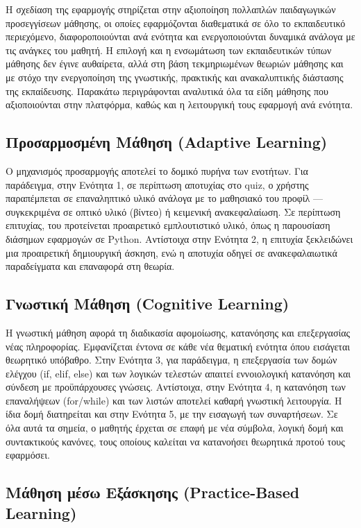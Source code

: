 \documentclass[11pt]{report}
\begin{document}
Η σχεδίαση της εφαρμογής στηρίζεται στην αξιοποίηση πολλαπλών παιδαγωγικών προσεγγίσεων μάθησης, οι οποίες εφαρμόζονται διαθεματικά σε όλο το εκπαιδευτικό περιεχόμενο, διαφοροποιούνται ανά ενότητα και ενεργοποιούνται δυναμικά ανάλογα με τις ανάγκες του μαθητή. Η επιλογή και η ενσωμάτωση των εκπαιδευτικών τύπων μάθησης δεν έγινε αυθαίρετα, αλλά στη βάση τεκμηριωμένων θεωριών μάθησης και με στόχο την ενεργοποίηση της γνωστικής, πρακτικής και ανακαλυπτικής διάστασης της εκπαίδευσης. Παρακάτω περιγράφονται αναλυτικά όλα τα είδη μάθησης που αξιοποιούνται στην πλατφόρμα, καθώς και η λειτουργική τους εφαρμογή ανά ενότητα. 

\subsection*{Προσαρμοσμένη Μάθηση (Adaptive Learning)}

Ο μηχανισμός προσαρμογής αποτελεί το δομικό πυρήνα των ενοτήτων. Για παράδειγμα, στην Ενότητα 1, σε περίπτωση αποτυχίας στο quiz, ο χρήστης παραπέμπεται σε επαναληπτικό υλικό ανάλογα με το μαθησιακό του προφίλ — συγκεκριμένα σε οπτικό υλικό (βίντεο) ή κειμενική ανακεφαλαίωση. Σε περίπτωση επιτυχίας, του προτείνεται προαιρετικό εμπλουτιστικό υλικό, όπως η παρουσίαση διάσημων εφαρμογών σε Python. Αντίστοιχα στην Ενότητα 2, η επιτυχία ξεκλειδώνει μια προαιρετική δημιουργική άσκηση, ενώ η αποτυχία οδηγεί σε ανακεφαλαιωτικά παραδείγματα και επαναφορά στη θεωρία.  

\subsection*{Γνωστική Μάθηση (Cognitive Learning) }

Η γνωστική μάθηση αφορά τη διαδικασία αφομοίωσης, κατανόησης και επεξεργασίας νέας πληροφορίας. Εμφανίζεται έντονα σε κάθε νέα θεματική ενότητα όπου εισάγεται θεωρητικό υπόβαθρο. Στην Ενότητα 3, για παράδειγμα, η επεξεργασία των δομών ελέγχου (if, elif, else) και των λογικών τελεστών απαιτεί εννοιολογική κατανόηση και σύνδεση με προϋπάρχουσες γνώσεις. Αντίστοιχα, στην Ενότητα 4, η κατανόηση των επαναλήψεων (for/while) και των λιστών αποτελεί καθαρή γνωστική λειτουργία. Η ίδια δομή διατηρείται και στην Ενότητα 5, με την εισαγωγή των συναρτήσεων. Σε όλα αυτά τα σημεία, ο μαθητής έρχεται σε επαφή με νέα σύμβολα, λογική δομή και συντακτικούς κανόνες, τους οποίους καλείται να κατανοήσει θεωρητικά προτού τους εφαρμόσει. 

\subsection*{Μάθηση μέσω Εξάσκησης (Practice-Based Learning) }
\end{document}
